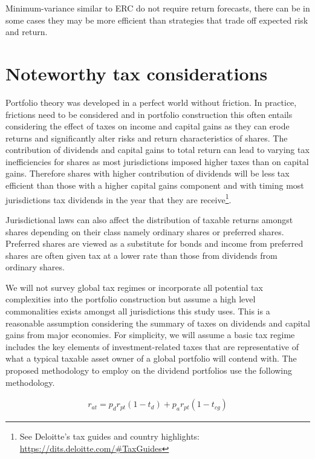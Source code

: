 \documentclass[11pt,preprint, authoryear]{elsarticle}
\numberwithin{equation}{section}
\numberwithin{figure}{section}
\numberwithin{table}{section}
\let\rmarkdownfootnote\footnote%
\def\footnote{\protect\rmarkdownfootnote}
\begin{document}
Minimum-variance similar to ERC do not require return forecasts, there
can be in some cases they may be more efficient than strategies that
trade off expected risk and return.

\hypertarget{noteworthy-tax-considerations}{%
\section*{Noteworthy tax
considerations}\label{noteworthy-tax-considerations}}

Portfolio theory was developed in a perfect world without friction. In
practice, frictions need to be considered and in portfolio construction
this often entails considering the effect of taxes on income and capital
gains as they can erode returns and significantly alter risks and return
characteristics of shares. The contribution of dividends and capital
gains to total return can lead to varying tax inefficiencies for shares
as most jurisdictions imposed higher taxes than on capital gains.
Therefore shares with higher contribution of dividends will be less tax
efficient than those with a higher capital gains component and with
timing most jurisdictions tax dividends in the year that they are
receive\footnote{See Deloitte's tax guides and country highlights:
  \url{https://dits.deloitte.com/\#TaxGuides}}.

Jurisdictional laws can also affect the distribution of taxable returns
amongst shares depending on their class namely ordinary shares or
preferred shares. Preferred shares are viewed as a substitute for bonds
and income from preferred shares are often given tax at a lower rate
than those from dividends from ordinary shares.

We will not survey global tax regimes or incorporate all potential tax
complexities into the portfolio construction but assume a high level
commonalities exists amongst all jurisdictions this study uses. This is
a reasonable assumption considering the summary of taxes on dividends
and capital gains from major economies. For simplicity, we will assume a
basic tax regime includes the key elements of investment-related taxes
that are representative of what a typical taxable asset owner of a
global portfolio will contend with. The proposed methodology to employ
on the dividend portfolios use the following methodology.

\begin{align}
r_{a t}=p_d r_{p t}\left(1-t_d\right)+p_a r_{p t}\left(1-t_{c g}\right)
\end{align}
\end{document}
